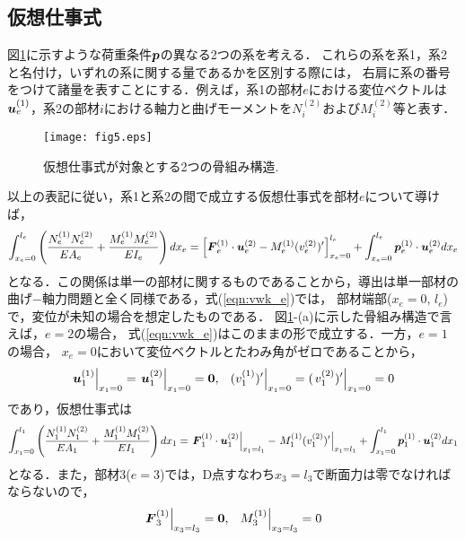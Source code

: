 \documentclass[10pt,a4j]{jarticle}
\begin{document}
\subsection{仮想仕事式}
図\ref{fig:fig5}に示すような荷重条件$\mbox{\boldmath $p$}$の異なる2つの系を考える．
これらの系を系1，系2と名付け，いずれの系に関する量であるかを区別する際には，
右肩に系の番号をつけて諸量を表すことにする．例えば，系1の部材$e$における変位ベクトルは
$\mbox{\boldmath $u$}^{(1)}_e$，系2の部材$i$における軸力と曲げモーメントを$N^{(2)}_i$および$M^{(2)}_i$等と表す．
\begin{figure}[h]
	\begin{center}
	\texttt{[image: fig5.eps]} 
	\end{center}
	\caption{仮想仕事式が対象とする2つの骨組み構造.} 
	\label{fig:fig5}
\end{figure}
以上の表記に従い，系1と系2の間で成立する仮想仕事式を部材$e$について導けば，
\begin{equation}
	\int_{x_e=0}^{l_e} 
	\left(
	\frac{N_e^{(1)}N_e^{(2)}}{EA_e}
	+
	\frac{M_e^{(1)}M_e^{(2)}}{EI_e}
	\right)
	dx_e
	=
	\left[ 
		\mbox{\boldmath $F$}_e^{(1)}\cdot \mbox{\boldmath $u$}_e^{(2)}
		-
		M_e^{(1)}
		(v_e^{(2)})'
	\right]_{x_e=0}^{l_e}
	+
	\int_{x_e=0}^{l_e} 
	\mbox{\boldmath $p$}_e^{(1)}\cdot \mbox{\boldmath $u$}_e^{(2)}
	dx_e
	\label{eqn:vwk_e}
\end{equation}
となる．この関係は単一の部材に関するものであることから，導出は単一部材の
曲げ−軸力問題と全く同様である，式(\ref{eqn:vwk_e})では，
部材端部($x_e=0,\,l_e$)で，変位が未知の場合を想定したものである．
図\ref{fig:fig5}-(a)に示した骨組み構造で言えば，$e=2$の場合，
式(\ref{eqn:vwk_e})はこのままの形で成立する．一方，$e=1$の場合，
$x_e=0$において変位ベクトルとたわみ角がゼロであることから，
\begin{equation}
	\left. \fat{u}^{(1)}_1\right|_{x_1=0}
	=
	\left. \fat{u}^{(2)}_1\right|_{x_1=0}
	=\fat{0}, \ \ 
	\left. (v^{(1)}_1)'\right|_{x_1=0}
	=(
	\left.
	v^{(2)}_1)'\right|_{x_1=0}
	=0
	\label{eqn:fixed_end}
\end{equation}
であり，仮想仕事式は
\begin{equation}
	\int_{x_1=0}^{l_1} 
	\left(
	\frac{N_1^{(1)}N_1^{(2)}}{EA_1}
	+
	\frac{M_1^{(1)}M_1^{(2)}}{EI_1}
	\right)
	dx_1
	=
	\left. 
		\mbox{\boldmath $F$}_1^{(1)}\cdot \mbox{\boldmath $u$}_1^{(2)}
	\right|_{x_1=l_1}
		-
	\left. 
		M_1^{(1)}
		(v_1^{(2)})'
	\right|_{x_1=l_1}
	+
	\int_{x_1=0}^{l_1} 
	\mbox{\boldmath $p$}_1^{(1)}\cdot \mbox{\boldmath $u$}_1^{(2)}
	dx_1
	\label{eqn:}
\end{equation}
となる．また，部材3($e=3$)では，D点すなわち$x_3=l_3$で断面力は零でなければならないので，
\begin{equation}
	\left. \fat{F}^{(1)}_3 \right|_{x_3=l_3}=\fat{0}, \ \ 
	\left. M_3^{(1)} \right|_{x_3=l_3}=0
	\label{eqn:free_end}
\end{equation}
\end{document}
